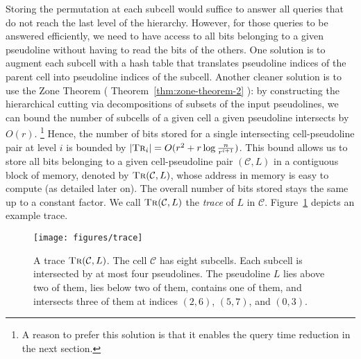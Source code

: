 Storing the permutation at each subcell would suffice to answer all
queries that do not reach the last level of the hierarchy. However,
for those queries to be answered efficiently,
we need to have access to all bits belonging to a given pseudoline
without having to read the bits of the others.
%
One solution is to augment each subcell with a hash table that translates
pseudoline indices of the parent cell into pseudoline indices of the subcell.
%
Another cleaner solution is to use the Zone Theorem
(%
\ifjournal%
Theorem~\ref{thm:zone-theorem-2}%
\else%
\cite{BEPY90,CGL85,Go04}%
\fi%
): by constructing the hierarchical cutting
via decompositions of subsets of the input pseudolines, we can bound
the number of subcells of a given cell a given pseudoline intersects by
\(O(r)\).%
\footnote{A reason to prefer this solution is that it enables the query time
reduction in the next section.}
%
Hence,
the number of bits stored for a single intersecting cell-pseudoline
pair at level \(i\) is bounded by
\(|\textsc{Tr}_i| = O(r^2 + r \log{\frac{n}{r^{i+1}}})\).
This bound allows us to store all bits belonging to a given cell-pseudoline pair
\((\mathcal{C},L)\)
in a contiguous block of memory, denoted by \(\textsc{Tr}(\mathcal{C},L)\),
whose address in memory is easy to compute (as detailed later on).
%
The overall number of bits stored stays the same up to a constant factor.
%
We call
\(\textsc{Tr}(\mathcal{C},L)\) the \emph{trace} of \(L\) in \(\mathcal{C}\).
Figure~\ref{fig:trace} depicts an example trace.
%
\begin{figure}
  \centering{}
  \texttt{[image: figures/trace]}
  \caption{%
	  A trace \(\textsc{Tr}(\mathcal{C}, L)\). The cell \(\mathcal{C}\) has
	  eight subcells. Each subcell is intersected by at most four pseudolines.
	  The pseudoline \(L\) lies above two of them, lies below two of them,
	  contains one of them, and intersects three of them at indices
	  \((2,6)\), \((5,7)\), and \((0, 3)\).
  }\label{fig:trace}
\end{figure}
%


